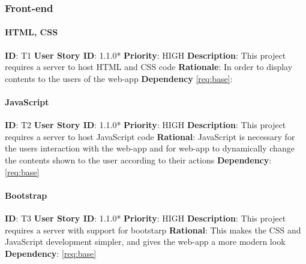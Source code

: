 \documentclass{article}
\begin{document}
\subsubsection{Front-end}

\paragraph{HTML, CSS}\label{req:}
\textbf{ID}: T1\newline
\textbf{User Story ID}: 1.1.0*\newline
\textbf{Priority}: HIGH\newline
\textbf{Description}: This project requires a server to host HTML and CSS code\newline
\textbf{Rationale}: In order to display contents to the users of the web-app\newline
\textbf{Dependency} \ref{req:base}:

\paragraph{JavaScript}\label{req:}
\textbf{ID}: T2\newline
\textbf{User Story ID}: 1.1.0*\newline
\textbf{Priority}: HIGH\newline
\textbf{Description}: This project requires a server to host JavaScript code\newline
\textbf{Rational}: JavaScript is necessary for the users interaction with the web-app and for web-app to dynamically change the contents shown to the user according to their actions\newline
\textbf{Dependency}: \ref{req:base}\newline

\paragraph{Bootstrap}\label{req:}
\textbf{ID}: T3\newline
\textbf{User Story ID}: 1.1.0* \newline
\textbf{Priority}: HIGH\newline
\textbf{Description}: This project requires a server with support for bootstarp\newline
\textbf{Rational}: This makes the CSS and JavaScript development simpler, and gives the web-app a more modern look\newline
\textbf{Dependency}: \ref{req:base}\newline
\end{document}
